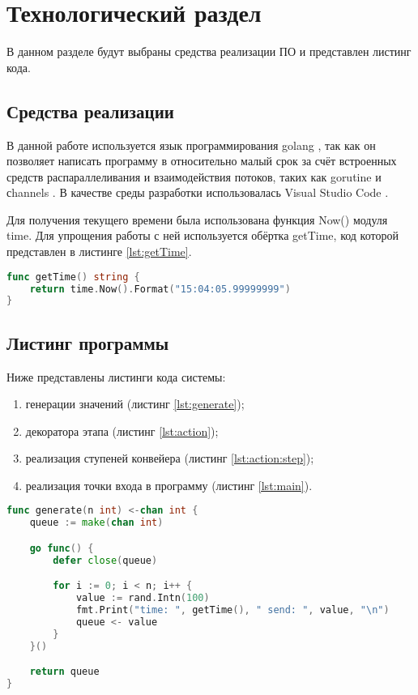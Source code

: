 \chapter{ Технологический раздел}
\label{cha:technological}

    В данном разделе будут выбраны средства реализации ПО и представлен листинг кода. 

    \section{Средства реализации}
        В данной работе используется язык программирования golang \cite{vs}, так как
        он позволяет написать программу в относительно малый срок за счёт
        встроенных средств распараллеливания и взаимодействия потоков, таких как gorutine и сhannels \cite{vs}. 
        В качестве среды разработки использовалась Visual Studio Code \cite{binary-search}.

        Для получения текущего времени была использована функция Now() модуля time. 
        Для упрощения работы с ней используется обёртка getTime, 
        код которой представлен в листинге \ref{lst:getTime}.

        \begin{lstlisting}[language=go, label=lst:getTime, caption=Функция получения текущего времени]
func getTime() string {
    return time.Now().Format("15:04:05.99999999")
}
        \end{lstlisting}

    \section{Листинг программы}
        Ниже представлены листинги кода системы:
        \begin{enumerate}
            \item генерации значений (листинг \ref{lst:generate});
            \item декоратора этапа (листинг \ref{lst:action});
            \item реализация ступеней конвейера (листинг \ref{lst:action:step});
            \item реализация точки входа в программу (листинг \ref{lst:main}).
        \end{enumerate}
        
        \begin{lstlisting}[language=go, label=lst:generate, caption=Реализация генерации значений]
func generate(n int) <-chan int {
    queue := make(chan int)

    go func() {
        defer close(queue)

        for i := 0; i < n; i++ {
            value := rand.Intn(100)
            fmt.Print("time: ", getTime(), " send: ", value, "\n")
            queue <- value
        }
    }()

    return queue
}
        \end{lstlisting}

